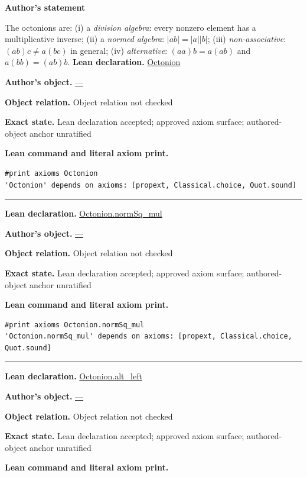 \documentclass[11pt]{article}
\theoremstyle{plain}
\theoremstyle{definition}
\theoremstyle{remark}
\begin{document}
\begin{tcolorbox}[provenancecard,title={8. Definition},title after break={8. Definition (continued)}]
\textbf{Author's statement}\par
The octonions are: (i) a \emph{division algebra}: every nonzero element has a
multiplicative inverse; (ii) a \emph{normed algebra}: $|ab|=|a||b|$; (iii)
\emph{non-associative}: $(ab)c\neq a(bc)$ in general; (iv) \emph{alternative}:
$(aa)b=a(ab)$ and $a(bb)=(ab)b$.
\tcblower
\textbf{Lean declaration.} \url{Octonion}
\par\textbf{Author's object.} \url{—}
\par\textbf{Object relation.} Object relation not checked
\par\textbf{Exact state.} Lean declaration accepted; approved axiom surface; authored-object anchor unratified
\par\smallskip\textbf{Lean command and literal axiom print.}
\begin{Verbatim}[breaklines=true,breakanywhere=true,fontsize=\small]
#print axioms Octonion
'Octonion' depends on axioms: [propext, Classical.choice, Quot.sound]
\end{Verbatim}
\medskip\hrule\medskip
\textbf{Lean declaration.} \url{Octonion.normSq_mul}
\par\textbf{Author's object.} \url{—}
\par\textbf{Object relation.} Object relation not checked
\par\textbf{Exact state.} Lean declaration accepted; approved axiom surface; authored-object anchor unratified
\par\smallskip\textbf{Lean command and literal axiom print.}
\begin{Verbatim}[breaklines=true,breakanywhere=true,fontsize=\small]
#print axioms Octonion.normSq_mul
'Octonion.normSq_mul' depends on axioms: [propext, Classical.choice, Quot.sound]
\end{Verbatim}
\medskip\hrule\medskip
\textbf{Lean declaration.} \url{Octonion.alt_left}
\par\textbf{Author's object.} \url{—}
\par\textbf{Object relation.} Object relation not checked
\par\textbf{Exact state.} Lean declaration accepted; approved axiom surface; authored-object anchor unratified
\par\smallskip\textbf{Lean command and literal axiom print.}
\begin{Verbatim}[breaklines=true,breakanywhere=true,fontsize=\small]

\end{Verbatim}
\end{tcolorbox}
\end{document}
